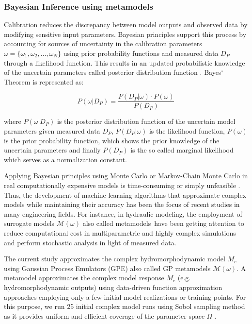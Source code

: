 \documentclass[draft,linenumbers,onecolumn]{agujournal2019} %
\begin{document}
\subsubsection{Bayesian Inference using metamodels}
\label{subsec:sec2.6.1}
Calibration reduces the discrepancy between model outputs and observed data by modifying sensitive input parameters. Bayesian principles support this process by accounting for sources of uncertainty in the calibration parameters \( \omega = \{\omega_1, \omega_2, \ldots, \omega_N\} \) using  prior probability functions and measured data  \(D_P\) through a likelihood function. This results in an updated probabilistic knowledge of the uncertain parameters called posterior distribution function \cite{smith1992bayesian,lim2017comprehensive}. Bayes` Theorem is represented as: 

\[
P(\omega | D_P) = \frac{P(D_P | \omega) \cdot P(\omega)}{P(D_P)}
\]

where \( P(\omega | D_P) \) is the posterior distribution function of the uncertain model parameters given measured data \(D_P\), \(P(D_P | \omega)\)  is the likelihood function,  \( P(\omega) \) is the prior probability function, which  shows the prior knowledge of the uncertain parameters and finally \( P(D_P) \) is the so called marginal likelihood which serves as a normalization constant.  

Applying Bayesian principles using Monte Carlo or Markov-Chain Monte Carlo in real computationally expensive models is time-consuming or simply unfeasible \cite{smith1992bayesian,oladyshkin2020bayesian3}.
Thus, the development of machine learning algorithms that approximate complex models while maintaining their accuracy has been the focus of recent studies in many engineering fields. For instance, in hydraulic modeling, the employment of surrogate models \( \mathcal{M}(\omega) \) also called metamodels have been getting attention to reduce computational cost in multiparametric and highly complex simulations and perform stochastic analysis in light of measured data.

The current study approximates the complex hydromorphodynamic model \( M_c \) using Gaussian Process Emulators (GPE) also called GP metamodels \( \mathcal{M}(\omega) \). A metamodel approximates the complex model response \( M_c \) (e.g. hydromorphodynamic outputs) using data-driven function approximation approaches \cite{razavi2012review} employing only a few initial model realizations or training points. For this purpose, we run 25 initial complex model runs using Sobol sampling method as it provides uniform and efficient coverage of the parameter space \(\Omega\) \cite{garud2017design}.
\end{document}
